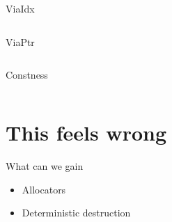 \documentclass[aspectratio=169,notes]{beamer}
\begin{document}
	\begin{frame}[fragile]{ViaIdx}
		\begin{columns}[T]
		\begin{column}{0.52\textwidth}
		
		\end{column}
		\begin{column}{0.48\textwidth}
		
		\end{column}
		\end{columns}
	\end{frame}

	\begin{frame}[fragile]{ViaPtr}
		\begin{columns}[T]
		\begin{column}{0.52\textwidth}
		
		\end{column}
		\begin{column}{0.48\textwidth}
		
		\end{column}
		\end{columns}
	\end{frame}

	\begin{frame}[fragile]{Constness}
		\begin{columns}[T]
		\begin{column}{0.52\textwidth}
		
		\end{column}
		\begin{column}{0.48\textwidth}
		\end{column}
		\end{columns}
	\end{frame}

	\section{This feels wrong}

	\begin{frame}[fragile]{What can we gain}
		\begin{itemize}
			\item Allocators
			\item Deterministic destruction
		\end{itemize}
	\end{frame}
\end{document}
